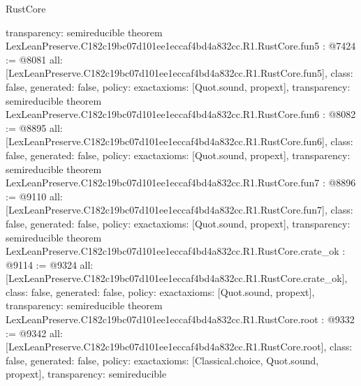 \begin{lexlean}{RustCore}
\begin{coremodule}
{  transparency: semireducible
}
theorem LexLeanPreserve.C182c19bc07d101ee1eccaf4bd4a832cc.R1.RustCore.fun5 : @7424 := @8081 {
  all: [LexLeanPreserve.C182c19bc07d101ee1eccaf4bd4a832cc.R1.RustCore.fun5],
  class: false,
  generated: false,
  policy: exact{axioms: [Quot.sound, propext]},
  transparency: semireducible
}
theorem LexLeanPreserve.C182c19bc07d101ee1eccaf4bd4a832cc.R1.RustCore.fun6 : @8082 := @8895 {
  all: [LexLeanPreserve.C182c19bc07d101ee1eccaf4bd4a832cc.R1.RustCore.fun6],
  class: false,
  generated: false,
  policy: exact{axioms: [Quot.sound, propext]},
  transparency: semireducible
}
theorem LexLeanPreserve.C182c19bc07d101ee1eccaf4bd4a832cc.R1.RustCore.fun7 : @8896 := @9110 {
  all: [LexLeanPreserve.C182c19bc07d101ee1eccaf4bd4a832cc.R1.RustCore.fun7],
  class: false,
  generated: false,
  policy: exact{axioms: [Quot.sound, propext]},
  transparency: semireducible
}
theorem LexLeanPreserve.C182c19bc07d101ee1eccaf4bd4a832cc.R1.RustCore.crate_ok : @9114 := @9324 {
  all: [LexLeanPreserve.C182c19bc07d101ee1eccaf4bd4a832cc.R1.RustCore.crate_ok],
  class: false,
  generated: false,
  policy: exact{axioms: [Quot.sound, propext]},
  transparency: semireducible
}
theorem LexLeanPreserve.C182c19bc07d101ee1eccaf4bd4a832cc.R1.RustCore.root : @9332 := @9342 {
  all: [LexLeanPreserve.C182c19bc07d101ee1eccaf4bd4a832cc.R1.RustCore.root],
  class: false,
  generated: false,
  policy: exact{axioms: [Classical.choice, Quot.sound, propext]},
  transparency: semireducible
}


\end{coremodule}
\end{lexlean}
